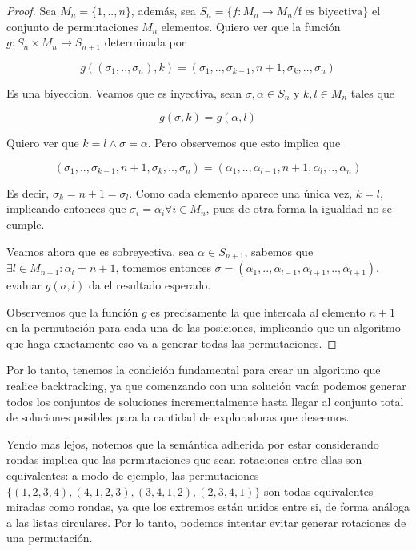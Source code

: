 \documentclass{article}
\theoremstyle{definition}
\theoremstyle{remark}
\begin{document}
\begin{proof}
Sea $M_n = \{1, .., n\}$, además, sea $S_n = \{ f : M_n \to M_n / \text{f es biyectiva}\}$ el conjunto de permutaciones $M_n$ elementos. Quiero ver que la función $g : S_n \times M_n \to S_{n+1}$ determinada por

$$g((\sigma_1, .., \sigma_n), k) = (\sigma_1, .., \sigma_{k-1}, n+1, \sigma_k, .., \sigma_n)$$

Es una biyeccion. Veamos que es inyectiva, sean $\sigma, \alpha \in S_n$ y $k, l \in M_n$ tales que

$$g(\sigma, k) = g(\alpha, l)$$

Quiero ver que $k = l \wedge \sigma = \alpha$. Pero observemos que esto implica que

$$(\sigma_1, .., \sigma_{k-1}, n+1, \sigma_k, .., \sigma_n) = (\alpha_1, .., \alpha_{l-1}, n+1, \alpha_l, .., \alpha_n)$$

Es decir, $\sigma_k = n + 1 = \sigma_l$. Como cada elemento aparece una única vez, $k = l$, implicando entonces que $\sigma_i = \alpha_i \forall i \in M_n$, pues de otra forma la igualdad no se cumple.

Veamos ahora que es sobreyectiva, sea $\alpha \in S_{n+1}$, sabemos que $\exists l \in M_{n+1} : \alpha_l = n+1$, tomemos entonces $\sigma = (\alpha_1, .., \alpha_{l-1}, \alpha_{l+1}, .., \alpha_{l+1})$, evaluar $g(\sigma, l)$ da el resultado esperado.

Observemos que la función $g$ es precisamente la que intercala al elemento $n+1$ en la permutación para cada una de las posiciones, implicando que un algoritmo que haga exactamente eso va a generar todas las permutaciones.
\end{proof}

Por lo tanto, tenemos la condición fundamental para crear un algoritmo que realice backtracking, ya que comenzando con una solución vacía podemos generar todos los conjuntos de soluciones incrementalmente hasta llegar al conjunto total de soluciones posibles para la cantidad de exploradoras que deseemos.

Yendo mas lejos, notemos que la semántica adherida por estar considerando rondas implica que las permutaciones que sean rotaciones entre ellas son equivalentes: a modo de ejemplo, las permutaciones $\{(1, 2, 3, 4), (4, 1, 2, 3), (3, 4, 1, 2), (2, 3, 4, 1)\}$ son todas equivalentes miradas como rondas, ya que los extremos están unidos entre si, de forma análoga a las listas circulares. Por lo tanto, podemos intentar evitar generar rotaciones de una permutación.
\end{document}
